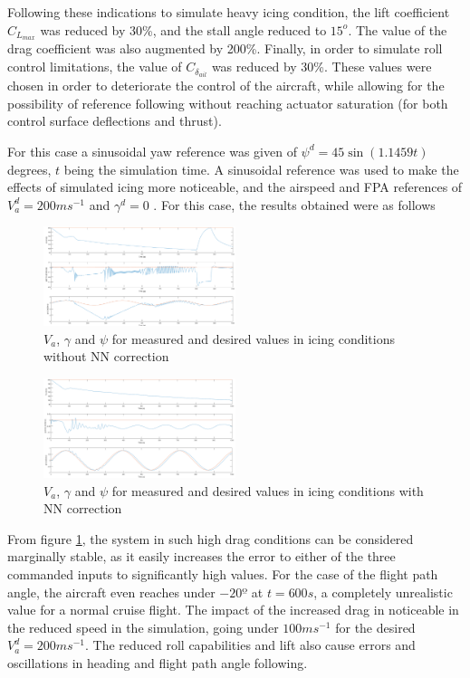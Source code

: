 Following these indications to simulate heavy icing condition, the lift coefficient $C_{L_{max}}$ was reduced by 30\%, and the stall angle reduced to $15^o$. The value of the drag coefficient was also augmented by 200\%. Finally, in order to simulate roll control limitations, the value of $C_{\delta_{ail}}$ was reduced by 30\%. These values were chosen in order to deteriorate the control of the aircraft, while allowing for the possibility of reference following without reaching actuator saturation (for both control surface deflections and thrust). 

For this case a sinusoidal yaw reference was given of $\psi^d= 45 \sin (1.1459t)$ degrees, $t$ being the simulation time. A sinusoidal reference was used to make the effects of simulated icing more noticeable, and the airspeed and FPA references of $V_a^d=200ms^{-1}$ and $\gamma^d=0$ . For this case, the results obtained were as follows

\begin{figure}[h]
\centering
\includegraphics[width=0.5\textwidth]{../Figures/Results/ref_icing.PNG}
\caption[Reference following in icing conditions]{$V_a$, $\gamma$ and $\psi$ for measured and desired values in icing conditions without NN correction}
\label{fig:ref_icing}
\end{figure}

\begin{figure}[h]
\centering
\includegraphics[width=0.5\textwidth]{../Figures/Results/ref_icing_NN.PNG}
\caption[Reference following in icing conditions with NN correction]{$V_a$, $\gamma$ and $\psi$ for measured and desired values in icing conditions with NN correction}
\label{fig:ref_icing_NN}
\end{figure}

From figure \ref{fig:ref_icing}, the system in such high drag conditions can be considered marginally stable, as it easily increases the error to either of the three commanded inputs to significantly high values. For the case of the flight path angle, the aircraft even reaches under $-20º$ at $t=600s$, a completely unrealistic value for a normal cruise flight. The impact of the increased drag in noticeable in the reduced speed in the simulation, going under $100ms^{-1}$ for the desired $V_a^d=200ms^{-1}$. The reduced roll capabilities and lift also cause errors and oscillations in heading and flight path angle following.

